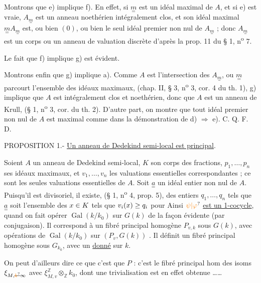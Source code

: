 Montrons que e) implique f). En effet, si $\underset{=}{m}$ est un idéal maximal de $A$, et si e) est vraie, $A_{\underset{=}{m}}$ est un anneau noethérien intégralement clos, et son idéal maximal $\underset{=}{m}A_{\underset{=}{m}}$ est, ou bien $(0)$, ou bien le seul idéal premier non nul de $A_{\underset{=}{m}}$ ; donc $A_{\underset{=}{m}}$ est un corps ou un anneau de valuation discrète d'après la prop. 11 du § 1, n\textsuperscript{o} 7.

Le fait que f) implique g) est évident.

Montrons enfin que g) implique a). Comme $A$ est l'intersection des $A_{\underset{=}{m}}$, ou $\underset{=}{m}$ parcourt l'ensemble des idéaux maximaux, (chap. II, § 3, n\textsuperscript{o} 3, cor. 4 du th. 1), g) implique que $A$ est intégralement clos et noethérien, donc que $A$ est un anneau de Krull, (§ 1, n\textsuperscript{o} 3, cor. du th. 2). D'autre part, on montre que tout idéal premier non nul de $A$ est maximal comme dans la démonstration de d) $\Rightarrow$ e). C. Q. F. D.

PROPOSITION 1.- \uline{Un anneau de Dedekind semi-local est principal}.

Soient $A$ un anneau de Dedekind semi-local, $K$ son corps des fractions, $p_1,\ldots,p_n$ ses idéaux maximaux, et $v_1,\ldots,v_n$ les valuations essentielles correspondantes ; ce sont les seules valuations essentielles de $A$. Soit $\underset{=}{a}$ un idéal entier non nul de $A$. Puisqu'il est divisoriel, il existe, (§ 1, n\textsuperscript{o} 4, prop. 5), des entiers $q_1,\ldots,q_n$ tels que $\underset{=}{a}$ soit l'ensemble des $x\in K$ tels que $v_i(x)\geq q_i$ pour
Ainsi $\unsure{\psi|\varphi}$ \uline{est un 1-cocycle}, quand on fait opérer $\operatorname{Gal}(k/k_0)$ sur $G(k)$ de la façon évidente (par conjugaison). Il correspond à un fibré principal homogène $P_{v,k}$ sous $G(k)$, avec opérations de $\operatorname{Gal}(k/k_0)$ sur $(P_v,G(k))$ . Il définit  un fibré principal homogène  sous $G_{k_0}$, avec un \uline{ donné} sur $k$.

On peut d'ailleurs dire ce que c'est que $P$ : c'est le fibré principal hom des isoms  $\xi_{M,\deleted{\unsure{k}}\infty}$ avec $\xi_{M,v}^{\mathbb Z}\otimes_{\mathbb Z} k_0$, dont une trivialisation est en effet obtenue \ldots\ldots

